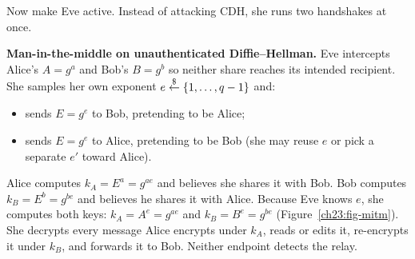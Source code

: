 Now make Eve active. Instead of attacking CDH, she runs two handshakes at once.

\begin{attackbox}
\label{ch23:mitm}
\textbf{Man-in-the-middle on unauthenticated Diffie--Hellman.}
Eve intercepts Alice's $A=g^a$ and Bob's $B=g^b$ so neither share reaches its
intended recipient. She samples her own exponent $e\stackrel{\$}{\gets}\{1,\dots,q-1\}$ and:
\begin{itemize}
  \item sends $E=g^e$ to Bob, pretending to be Alice;
  \item sends $E=g^e$ to Alice, pretending to be Bob (she may reuse $e$ or pick
        a separate $e'$ toward Alice).
\end{itemize}
Alice computes $k_A=E^a=g^{ae}$ and believes she shares it with Bob. Bob
computes $k_B=E^b=g^{be}$ and believes he shares it with Alice. Because Eve
knows $e$, she computes both keys: $k_A=A^e=g^{ae}$ and $k_B=B^e=g^{be}$
(Figure~\ref{ch23:fig-mitm}). She decrypts every message Alice encrypts under
$k_A$, reads or edits it, re-encrypts it under $k_B$, and forwards it to Bob.
Neither endpoint detects the relay.
\end{attackbox}

